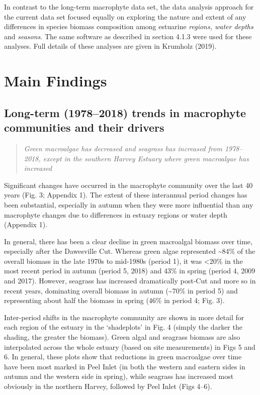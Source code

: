 \documentclass[
]{book}
\begin{document}
In contrast to the long-term macrophyte data set, the data analysis approach for the current data set focused equally on exploring the nature and extent of any differences in species biomass composition among estuarine \emph{regions, water depths} and \emph{seasons}. The same software as described in section 4.1.3 were used for these analyses. Full details of these analyses are given in Krumholz (2019).

\hypertarget{main-findings-2}{%
\section{Main Findings}\label{main-findings-2}}

\hypertarget{long-term-19782018-trends-in-macrophyte-communities-and-their-drivers-1}{%
\subsection{Long-term (1978--2018) trends in macrophyte communities and their drivers}\label{long-term-19782018-trends-in-macrophyte-communities-and-their-drivers-1}}

\begin{quote}
\emph{Green macroalgae has decreased and seagrass has increased from 1978--2018, except in the southern Harvey Estuary where green macroalgae has increased}
\end{quote}

Significant changes have occurred in the macrophyte community over the last 40 years (Fig. 3; Appendix 1). The extent of these interannual period changes has been substantial, especially in autumn when they were more influential than any macrophyte changes due to differences in estuary regions or water depth (Appendix 1).

In general, there has been a clear decline in green macroalgal biomass over time, especially after the Dawesville Cut. Whereas green algae represented \textasciitilde84\% of the overall biomass in the late 1970s to mid-1980s (period 1), it was \textless20\% in the most recent period in autumn (period 5, 2018) and 43\% in spring (period 4, 2009 and 2017). However, seagrass has increased dramatically post-Cut and more so in recent years, dominating overall biomass in autumn (\textasciitilde70\% in period 5) and representing about half the biomass in spring (46\% in period 4; Fig. 3).

Inter-period shifts in the macrophyte community are shown in more detail for each region of the estuary in the `shadeplots' in Fig. 4 (simply the darker the shading, the greater the biomass). Green algal and seagrass biomass are also interpolated across the whole estuary (based on site measurements) in Figs 5 and 6. In general, these plots show that reductions in green macroalgae over time have been most marked in Peel Inlet (in both the western and eastern sides in autumn and the western side in spring), while seagrass has increased most obviously in the northern Harvey, followed by Peel Inlet (Figs 4--6).
\end{document}
